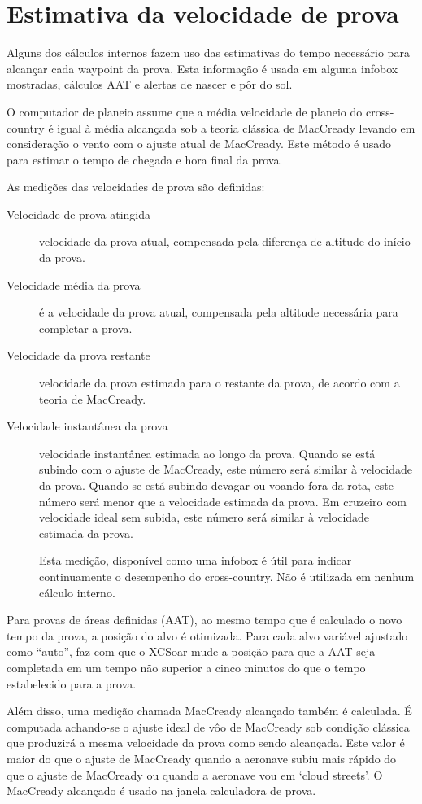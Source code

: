 \section{Estimativa da velocidade de prova}\label{sec:task-speed-estim}

Alguns dos cálculos internos fazem uso das estimativas do tempo necessário para alcançar cada waypoint da prova.  Esta informação é usada em alguma infobox mostradas, cálculos AAT e alertas de nascer e pôr do sol.

O computador de planeio assume que a média velocidade de planeio do cross-country é igual à média alcançada sob a teoria clássica de MacCready levando em consideração o vento com o ajuste atual de MacCready.  Este método é usado para estimar o tempo de chegada e hora final da prova.  


As medições das velocidades de prova são definidas:
\begin{description}
\item[Velocidade de prova atingida]  velocidade da prova atual, compensada pela diferença de altitude do início da prova.
\item[Velocidade média da prova]  é a velocidade da prova atual, compensada pela altitude necessária para completar a prova.
\item[Velocidade da prova restante] velocidade da prova estimada para o restante da prova, de acordo com a teoria de MacCready.
\item[Velocidade instantânea da prova]  velocidade instantânea estimada ao longo da prova.  Quando se está subindo com o ajuste de MacCready, este número será similar à velocidade da prova.  Quando se está subindo devagar ou voando fora da rota, este número será menor que a velocidade estimada da prova.  Em cruzeiro com velocidade ideal sem subida, este número será similar à velocidade estimada da prova.

Esta medição, disponível como uma infobox é útil para indicar continuamente o desempenho do cross-country.  Não é utilizada em nenhum cálculo interno.
\end{description}

Para provas de áreas definidas (AAT), ao mesmo tempo que é \tip calculado o novo tempo da prova, a posição do alvo é otimizada.  Para cada alvo variável ajustado como “auto”, faz com que o XCSoar mude a posição para que a AAT seja completada em um tempo não superior a cinco minutos do que o tempo estabelecido para a prova.

Além disso, uma medição chamada MacCready alcançado também é calculada.  É computada achando-se o ajuste ideal de vôo de MacCready sob condição clássica que produzirá a mesma velocidade da prova como sendo alcançada.  Este valor é maior do que o ajuste de MacCready quando a aeronave subiu mais rápido do que o ajuste de MacCready ou quando a aeronave vou em ‘cloud streets’.  O MacCready alcançado é usado na janela calculadora de prova.

